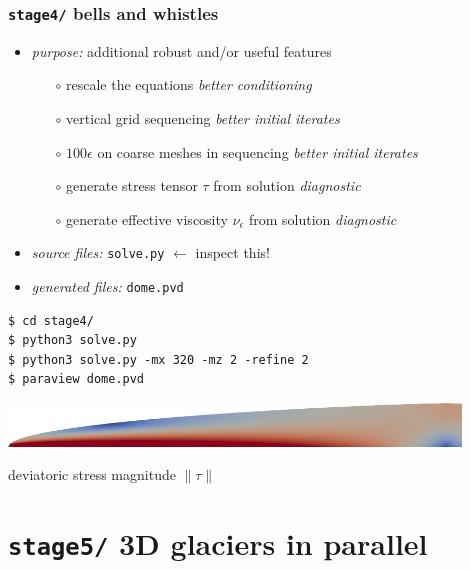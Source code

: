 \documentclass[10pt,
               hyperref={colorlinks,citecolor=DeepPink4,linkcolor=black,urlcolor=blue},
               svgnames]{beamer}
\newcommand{\eps}{\epsilon}
\begin{document}
\begin{frame}[fragile]
\frametitle{\texttt{stage4/} \qquad bells and whistles}

\begin{itemize}
\item \emph{purpose:} additional robust and/or useful features
    \begin{itemize}
    \item[$\circ$] rescale the equations  \hfill \emph{better conditioning}
    \item[$\circ$] vertical grid sequencing  \hfill \emph{better initial iterates}
    \item[$\circ$] $100\eps$ on coarse meshes in sequencing  \hfill \emph{better initial iterates}
    \item[$\circ$] generate stress tensor $\tau$ from solution  \hfill \emph{diagnostic}
    \item[$\circ$] generate effective viscosity $\nu_\eps$ from solution  \hfill \emph{diagnostic}
    \end{itemize}
\item \emph{source files:} \texttt{solve.py} \hfill \alert{$\gets$ inspect this!}
\item \emph{generated files:} \texttt{dome.pvd}
\end{itemize}

\bigskip
\begin{Verbatim}
$ cd stage4/
$ python3 solve.py
$ python3 solve.py -mx 320 -mz 2 -refine 2
$ paraview dome.pvd
\end{Verbatim}

\bigskip
\begin{center}
\includegraphics[width=0.9\textwidth]{figs/stage4.png}

{\tiny deviatoric stress magnitude $\|\tau\|$}
\end{center}
\end{frame}


\section{\texttt{stage5/} \qquad 3D glaciers in parallel}
\end{document}
